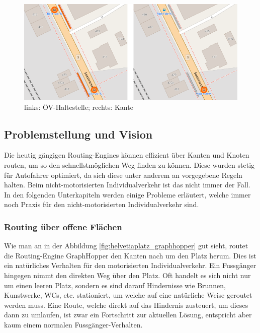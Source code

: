 \begin{figure}[ht]
\centering
\includegraphics[width=0.7\linewidth]{technicalreport/img/public_transport_stop}
\caption[Unterschied ÖV-Haltestelle und Kante]{links: ÖV-Haltestelle; rechts: Kante}
\label{fig:public_transport_stop}
\end{figure}


\subsection{Problemstellung und Vision}
\label{Problemstellung und Vision}
Die heutig gängigen Routing-Engines können effizient über Kanten und Knoten routen, um so den schnellstmöglichen Weg finden zu können. Diese wurden stetig für Autofahrer optimiert, da sich diese unter anderem an vorgegebene Regeln halten. Beim nicht-motorisierten Individualverkehr ist das nicht immer der Fall. In den folgenden Unterkapiteln werden einige Probleme erläutert, welche immer noch Praxis für den nicht-motorisierten Individualverkehr sind.

\subsubsection{Routing über offene Flächen}
\label{problem:Routing über offene Flächen}
Wie man an in der Abbildung \ref{fig:helvetiaplatz_graphhopper} gut sieht, routet die Routing-Engine GraphHopper \cite{graphhopper} den Kanten nach um den Platz herum. Dies ist ein natürliches Verhalten für den motorisierten Individualverkehr. Ein Fussgänger hingegen nimmt den direkten Weg über den Platz. Oft handelt es sich nicht nur um einen leeren Platz, sondern es sind darauf Hindernisse wie Brunnen, Kunstwerke, WCs, etc. stationiert, um welche auf eine natürliche Weise geroutet werden muss. Eine Route, welche direkt auf das Hindernis zusteuert, um dieses dann zu umlaufen, ist zwar ein Fortschritt zur aktuellen Lösung, entspricht aber kaum einem normalen Fussgänger-Verhalten. 

